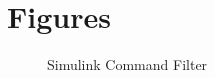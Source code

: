 \section{Figures}
\begin{figure}[h!]
	\centering
	\caption{Simulink Command Filter\label{fig:app.CF}}
\end{figure}		

%
%

%
%        

%
%
